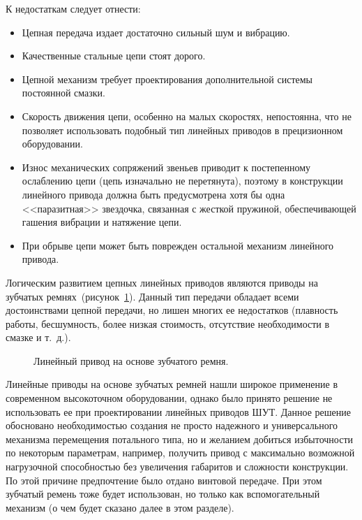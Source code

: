 К недостаткам следует отнести:

\begin{itemize}
	\item Цепная передача издает достаточно сильный шум и вибрацию.
	
	\item Качественные стальные цепи стоят дорого.
	
	\item Цепной механизм требует проектирования дополнительной системы постоянной смазки.
	
	\item Скорость движения цепи, особенно на малых скоростях, непостоянна, что не позволяет использовать подобный тип линейных приводов в прецизионном оборудовании.
	
	\item Износ механических сопряжений звеньев приводит к постепенному ослаблению цепи (цепь изначально не перетянута), поэтому в конструкции линейного привода должна быть предусмотрена хотя бы одна <<паразитная>> звездочка, связанная с жесткой пружиной, обеспечивающей гашения вибрации и натяжение цепи.
	
	\item При обрыве цепи может быть поврежден остальной механизм линейного привода.
\end{itemize}

Логическим развитием цепных линейных приводов являются приводы на зубчатых ремнях~(рисунок~\cref{fig:belt}). Данный тип передачи обладает всеми достоинствами цепной передачи, но лишен многих ее недостатков (плавность работы, бесшумность, более низкая стоимость, отсутствие необходимости в смазке и т.~д.). 

\begin{figure}[ht]
	\caption{Линейный привод на основе зубчатого ремня.}\label{fig:belt}
\end{figure}

Линейные приводы на основе зубчатых ремней нашли широкое применение в современном высокоточном оборудовании, однако было принято решение не использовать ее при проектировании линейных приводов ШУТ. Данное решение обосновано необходимостью создания не просто надежного и универсального механизма перемещения потального типа, но и желанием добиться избыточности по некоторым параметрам, например, получить привод с максимально возможной нагрузочной способностью без увеличения габаритов и сложности конструкции. По этой причине предпочтение было отдано винтовой передаче. При этом зубчатый ремень тоже будет использован, но только как вспомогательный механизм (о чем будет сказано далее в этом разделе).

